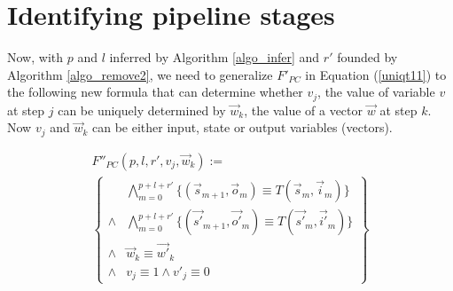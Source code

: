 \documentclass[conference]{IEEEtran}
\begin{document}

\section{Identifying pipeline stages}\label{sec_pipeinfer}







Now,
with $p$ and $l$ inferred by Algorithm \ref{algo_infer} and $r'$ founded by Algorithm \ref{algo_remove2},
we need to generalize $F'_{PC}$ in Equation (\ref{uniqt11}) to the following new formula that
can determine whether $v_j$,
the value of variable $v$ at step $j$
can be uniquely determined by $\vec{w}_k$,
the value of a vector $\vec{w}$ at step $k$.
Now $v_j$ and $\vec{w}_k$ can be either input, state or output variables (vectors).

\begin{multline}\label{uniqt2}
F''_{PC}(p,l,r',v_j,\vec{w}_k):=\\
\left\{
\begin{array}{cc}
&\bigwedge_{m=0}^{p+l+r'}
\{
(\vec{s}_{m+1},\vec{o}_m)\equiv T(\vec{s}_m,\vec{i}_m)
\}
\\
\wedge&\bigwedge_{m=0}^{p+l+r'}
\{
(\vec{s'}_{m+1},\vec{o'}_m)\equiv T(\vec{s'}_m,\vec{i'}_m)
\}
\\
\wedge&\vec{w}_{k}\equiv \vec{w'}_{k} \\
\wedge& v_{j}\equiv 1 \wedge  v'_{j}\equiv 0 
\end{array}
\right\}
\end{multline}
\end{document}
